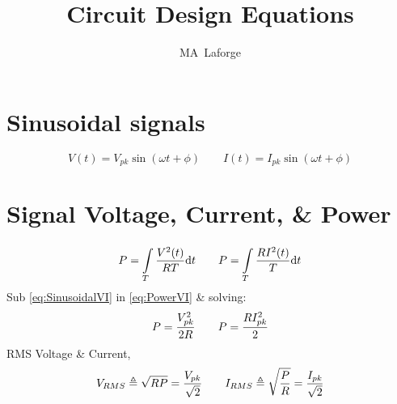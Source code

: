 \documentclass[journal]{IEEEtran}%
\title{Circuit Design Equations}%
\author{MA~Laforge}%
\newcommand{\dt}{\mathrm{d}t}%
\begin{document}
%
\maketitle%
%
\section{Sinusoidal signals}
%
\begin{equation}
	V(t)=V_{pk}\sin(\omega{t}+\phi)
	\qquad
	I(t)=I_{pk}\sin(\omega{t}+\phi)
\label{eq:SinusoidalVI}%
\end{equation}
%
\section{Signal Voltage, Current, \& Power}
%
\begin{equation}
	P=\int\limits_{T}^{}{{V^2(t)}\over{RT}}\dt
	\qquad
	P=\int\limits_{T}^{}{{RI^2(t)}\over{T}}\dt
\label{eq:PowerVI}%
\end{equation}
%
Sub \eqref{eq:SinusoidalVI} in \eqref{eq:PowerVI} \& solving:
\begin{equation}
	P={V_{pk}^2\over{2R}}
	\qquad
	P={RI_{pk}^2\over{2}}
	\nonumber
\end{equation}
%
RMS Voltage \& Current,
%
\begin{equation}
	V_{RMS}\triangleq\sqrt{RP}={V_{pk}\over\sqrt{2}}
	\qquad
	I_{RMS}\triangleq\sqrt{P\over{R}}={I_{pk}\over\sqrt{2}}
	\nonumber
\end{equation}
%
\end{document}
